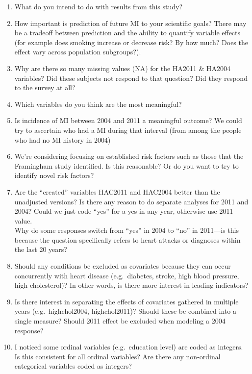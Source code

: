 \documentclass[11pt,]{article}
\begin{document}
\begin{enumerate}
\def\labelenumi{\arabic{enumi}.}
\item
  What do you intend to do with results from this study?
\item
  How important is prediction of future MI to your scientific goals?
  There may be a tradeoff between prediction and the ability to quantify
  variable effects (for example does smoking increase or decrease risk?
  By how much? Does the effect vary across population subgroups?).
\item
  Why are there so many missing values (NA) for the HA2011 \& HA2004
  variables? Did these subjects not respond to that question? Did they
  respond to the survey at all?
\item
  Which variables do you think are the most meaningful?
\item
  Is incidence of MI between 2004 and 2011 a meaningful outcome? We
  could try to ascertain who had a MI during that interval (from among
  the people who had no MI history in 2004)
\item
  We're considering focusing on established risk factors such as those
  that the Framingham study identified. Is this reasonable? Or do you
  want to try to identify novel risk factors?
\item
  Are the ``created'' variables HAC2011 and HAC2004 better than the
  unadjusted versions? Is there any reason to do separate analyses for
  2011 and 2004? Could we just code ``yes'' for a yes in any year,
  otherwise use 2011 value.\\Why do some responses switch from ``yes''
  in 2004 to ``no'' in 2011---is this because the question specifically
  refers to heart attacks or diagnoses within the last 20 years?
\item
  Should any conditions be excluded as covariates because they can occur
  concurrently with heart disease (e.g.~diabetes, stroke, high blood
  pressure, high cholesterol)? In other words, is there more interest in
  leading indicators?
\item
  Is there interest in separating the effects of covariates gathered in
  multiple years (e.g.~highchol2004, highchol2011)? Should these be
  combined into a single measure? Should 2011 effect be excluded when
  modeling a 2004 response?
\item
  I noticed some ordinal variables (e.g.~education level) are coded as
  integers. Is this consistent for all ordinal variables? Are there any
  non-ordinal categorical variables coded as integers?
\end{enumerate}
\end{document}
